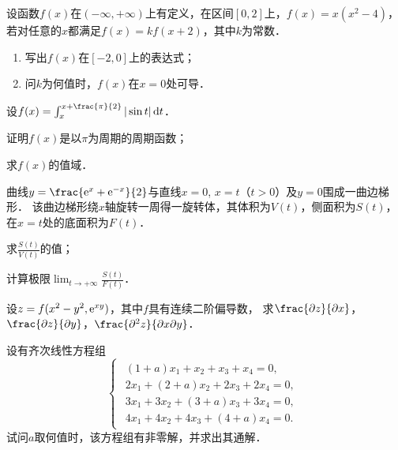 \documentclass[plain,noanswer,medmath]{../../template/jnuexam}
\begin{document}
\begin{problem}[points=10]
设函数$f(x)$在$(-\infty , +\infty)$上有定义，在区间$[0,2]$上，$f(x) = x(x^2 - 4)$，
若对任意的$x$都满足$f(x) = kf(x + 2)$，其中$k$为常数．
\begin{enumerate}
\item 写出$f(x)$在$[- 2,0]$上的表达式；
\item 问$k$为何值时，$f(x)$在$x = 0$处可导．
\end{enumerate}
\end{problem}


\begin{problem}[points=11]
设$f(x) = \int_x^{x + \frac{\pi}{2}} |\sin t|\dt$．\par
\begin{enumerate*}
\item 证明$f(x)$是以$\pi$为周期的周期函数；
\item 求$f(x)$的值域．
\end{enumerate*}
\end{problem}


\begin{problem}[points=12]
曲线$y = \frac{\e^x + \e^{- x}}{2}$与直线$x = 0$, $x = t$（$t > 0$）及$y = 0$围成一曲边梯形．
该曲边梯形绕$x$轴旋转一周得一旋转体，其体积为$V(t)$，侧面积为$S(t)$，在$x = t$处的底面积为$F(t)$．\par
\begin{enumerate*}
\item 求$\frac{S(t)}{V(t)}$的值；
\item 计算极限$\lim_{t \to +\infty} \frac{S(t)}{F(t)}$．
\end{enumerate*}
\end{problem}






\begin{problem}[points=10]
设$z = f(x^2 - y^2,\mathrm{e}^{xy})$，其中$f$具有连续二阶偏导数，
求$\frac{\pdz}{\pdx}$，$\frac{\pdz}{\pdy}$，$\frac{\pd^2 z}{\pdx\pd y}$．
\end{problem}


\begin{problem}[points=9]%
设有齐次线性方程组
$$\left\{\begin{array}{*{20}{l}}
  \begin{array}{*{20}{l}}
  (1 + a) x_1 + x_2 + x_3 + x_4 = 0, \\
  2x_1 + (2 + a) x_2 + 2x_3 + 2x_4 = 0, \\
  3x_1 + 3x_2 + (3 + a) x_3 + 3x_4 = 0, \\
  4x_1 + 4x_2 + 4x_3 + (4 + a) x_4 = 0.
\end{array}
\end{array} \right.$$
试问$a$取何值时，该方程组有非零解，并求出其通解．
\end{problem}


\end{document}
